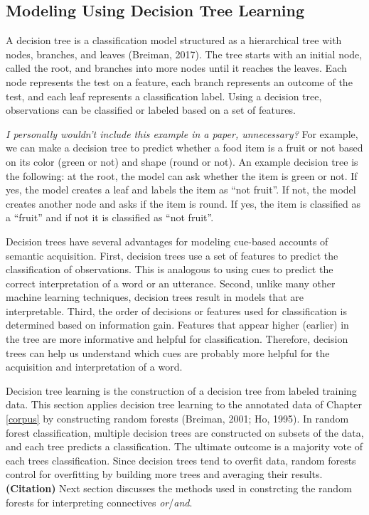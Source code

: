 \documentclass[floatsintext,man]{apa6}
\theoremstyle{definition}
\theoremstyle{definition}
\theoremstyle{definition}
\theoremstyle{remark}
\begin{document}
\subsection{Modeling Using Decision Tree Learning}\label{DecisionTrees}

A decision tree is a classification model structured as a hierarchical
tree with nodes, branches, and leaves (Breiman, 2017). The tree starts
with an initial node, called the root, and branches into more nodes
until it reaches the leaves. Each node represents the test on a feature,
each branch represents an outcome of the test, and each leaf represents
a classification label. Using a decision tree, observations can be
classified or labeled based on a set of features.

\emph{I personally wouldn't include this example in a paper,
unnecessary?} For example, we can make a decision tree to predict
whether a food item is a fruit or not based on its color (green or not)
and shape (round or not). An example decision tree is the following: at
the root, the model can ask whether the item is green or not. If yes,
the model creates a leaf and labels the item as \enquote{not fruit}. If
not, the model creates another node and asks if the item is round. If
yes, the item is classified as a \enquote{fruit} and if not it is
classified as \enquote{not fruit}.

Decision trees have several advantages for modeling cue-based accounts
of semantic acquisition. First, decision trees use a set of features to
predict the classification of observations. This is analogous to using
cues to predict the correct interpretation of a word or an utterance.
Second, unlike many other machine learning techniques, decision trees
result in models that are interpretable. Third, the order of decisions
or features used for classification is determined based on information
gain. Features that appear higher (earlier) in the tree are more
informative and helpful for classification. Therefore, decision trees
can help us understand which cues are probably more helpful for the
acquisition and interpretation of a word.

Decision tree learning is the construction of a decision tree from
labeled training data. This section applies decision tree learning to
the annotated data of Chapter \ref{corpus} by constructing random
forests (Breiman, 2001; Ho, 1995). In random forest classification,
multiple decision trees are constructed on subsets of the data, and each
tree predicts a classification. The ultimate outcome is a majority vote
of each trees classification. Since decision trees tend to overfit data,
random forests control for overfitting by building more trees and
averaging their results. \textbf{(Citation)} Next section discusses the
methods used in constrcting the random forests for interpreting
connectives \emph{or}/\emph{and}.
\end{document}
